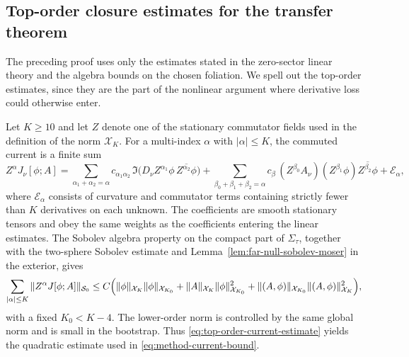 \documentclass[11pt]{article}
\numberwithin{equation}{section}
\theoremstyle{plain}
\theoremstyle{definition}
\theoremstyle{remark}
\begin{document}
\subsection{Top-order closure estimates for the transfer theorem}\label{subsec:top-order-closure-details}

The preceding proof uses only the estimates stated in the zero-sector linear theory and the algebra bounds on the chosen foliation. We spell out the top-order estimates, since they are the part of the nonlinear argument where derivative loss could otherwise enter.

Let $K\ge 10$ and let $Z$ denote one of the stationary commutator fields used in the definition of the norm $\mathcal X_K$. For a multi-index $\alpha$ with $|\alpha|\le K$, the commuted current is a finite sum
\begin{equation}\label{eq:top-order-current-expanded}
Z^\alpha J_\nu[\phi;A]
=
\sum_{\alpha_1+\alpha_2=\alpha}
 c_{\alpha_1\alpha_2}\,
\Im\bigl(D_\nu Z^{\alpha_1}\phi\,\overline{Z^{\alpha_2}\phi}\bigr)
+
\sum_{\beta_0+\beta_1+\beta_2=\alpha}
 c_{\beta}\,(Z^{\beta_0}A_\nu)
 (Z^{\beta_1}\phi)\overline{Z^{\beta_2}\phi}
+\mathcal E_{\alpha},
\end{equation}
where $\mathcal E_{\alpha}$ consists of curvature and commutator terms containing strictly fewer than $K$ derivatives on each unknown. The coefficients are smooth stationary tensors and obey the same weights as the coefficients entering the linear estimates. The Sobolev algebra property on the compact part of $\Sigma_\tau$, together with the two-sphere Sobolev estimate and Lemma~\ref{lem:far-null-sobolev-moser} in the exterior, gives
\begin{equation}\label{eq:top-order-current-estimate}
\sum_{|\alpha|\le K}\|Z^\alpha J[\phi;A]\|_{\mathcal S_0}
\le C\Bigl(\|\phi\|_{\mathcal X_K}\|\phi\|_{\mathcal X_{K_0}}
+
\|A\|_{\mathcal X_K}\|\phi\|_{\mathcal X_{K_0}}^2
+
\|(A,\phi)\|_{\mathcal X_{K_0}}\|(A,\phi)\|_{\mathcal X_K}^2\Bigr),
\end{equation}
with a fixed $K_0<K-4$. The lower-order norm is controlled by the same global norm and is small in the bootstrap. Thus \eqref{eq:top-order-current-estimate} yields the quadratic estimate used in \eqref{eq:method-current-bound}.
\end{document}
